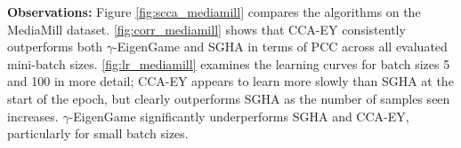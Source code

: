 
\textbf{Observations:}
Figure \ref{fig:scca_mediamill} compares the algorithms on the MediaMill dataset. \cref{fig:corr_mediamill} shows that CCA-EY consistently outperforms both $\gamma$-EigenGame and SGHA in terms of PCC across all evaluated mini-batch sizes.
\cref{fig:lr_mediamill} examines the learning curves for batch sizes 5 and 100 in more detail; CCA-EY appears to learn more slowly than SGHA at the start of the epoch, but clearly outperforms SGHA as the number of samples seen increases. $\gamma$-EigenGame significantly underperforms SGHA and CCA-EY, particularly for small batch sizes.

